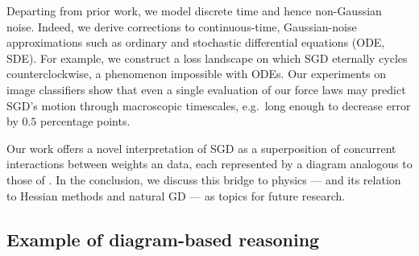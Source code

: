 \documentclass{article}
\theoremstyle{plain}
\theoremstyle{definition}
\newcommand{\wasq}[1]{\left[#1\right]}
\newcommand{\expc}{\mathbb{E}}
\begin{document}


    Departing from prior work, we model discrete time and hence non-Gaussian
    noise.  Indeed, we derive corrections to continuous-time, Gaussian-noise
    approximations such as ordinary and stochastic differential equations (ODE,
    SDE).
    For example, we construct a loss landscape on which SGD eternally cycles
    counterclockwise, a phenomenon impossible with ODEs. 
    Our experiments on image classifiers show that even a single evaluation of
    our force laws may predict SGD's motion through macroscopic timescales,
    e.g.\ long enough to decrease error by $0.5$ percentage points.



    Our work offers a novel interpretation of SGD as a superposition of
    concurrent interactions between weights an data, each represented by a
    diagram analogous to those of \citet{fe49, pe71}.
    In the conclusion, we discuss this bridge to physics --- and its relation
    to Hessian methods and natural GD --- as topics for future research.

    \subsection{Example of diagram-based reasoning}

        \newcommand{\nb} { \nabla }
        \newcommand{\lx} { l_x(\theta) }
        \newcommand{\teq} { \triangleq }
        \newcommand{\ex}[1] { \expc_x \wasq{#1} }
\end{document}
